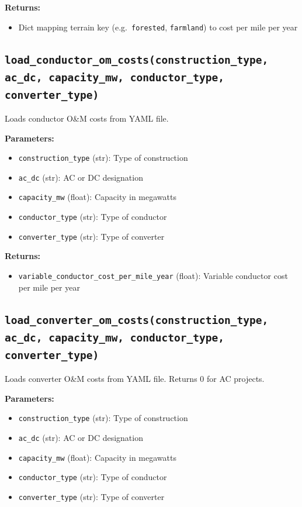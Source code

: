 \documentclass[ctcc_full_documentation.tex]{subfiles}
\begin{document}
\textbf{Returns:}
\begin{itemize}
    \item Dict mapping terrain key (e.g.\ \texttt{forested}, \texttt{farmland}) to cost per mile per year
\end{itemize}

\subsection{\texttt{load\_conductor\_om\_costs(construction\_type, ac\_dc, capacity\_mw, conductor\_type, converter\_type)}}

Loads conductor O\&M costs from YAML file.

\textbf{Parameters:}
\begin{itemize}
    \item \texttt{construction\_type} (str): Type of construction
    \item \texttt{ac\_dc} (str): AC or DC designation
    \item \texttt{capacity\_mw} (float): Capacity in megawatts
    \item \texttt{conductor\_type} (str): Type of conductor
    \item \texttt{converter\_type} (str): Type of converter
\end{itemize}

\textbf{Returns:}
\begin{itemize}
    \item \texttt{variable\_conductor\_cost\_per\_mile\_year} (float): Variable conductor cost per mile per year
\end{itemize}

\subsection{\texttt{load\_converter\_om\_costs(construction\_type, ac\_dc, capacity\_mw, conductor\_type, converter\_type)}}

Loads converter O\&M costs from YAML file. Returns 0 for AC projects.

\textbf{Parameters:}
\begin{itemize}
    \item \texttt{construction\_type} (str): Type of construction
    \item \texttt{ac\_dc} (str): AC or DC designation
    \item \texttt{capacity\_mw} (float): Capacity in megawatts
    \item \texttt{conductor\_type} (str): Type of conductor
    \item \texttt{converter\_type} (str): Type of converter
\end{itemize}
\end{document}
